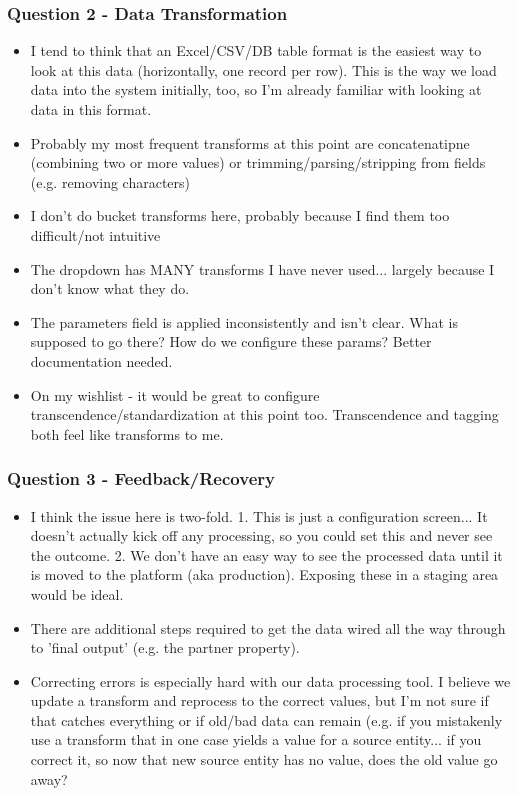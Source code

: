\documentclass[12pt,letterpaper]{article}
\begin{document}
\subsubsection*{Question 2 - Data Transformation}
\begin{itemize}
    \item I tend to think that an Excel/CSV/DB table format is the easiest way to look at this data (horizontally, one record per row). This is the way we load data into the system initially, too, so I'm already familiar with looking at data in this format. 
    \item Probably my most frequent transforms at this point are concatenatipne (combining two or more values) or trimming/parsing/stripping from fields (e.g. removing characters)
    \item I don't do bucket transforms here, probably because I find them too difficult/not intuitive
    \item The dropdown has MANY transforms I have never used... largely because I don't know what they do. 
    \item The parameters field is applied inconsistently and isn't clear. What is supposed to go there? How do we configure these params? Better documentation needed.
    \item On my wishlist - it would be great to configure transcendence/standardization at this point too. Transcendence and tagging both feel like transforms to me.
\end{itemize}

\subsubsection*{Question 3 - Feedback/Recovery}
\begin{itemize}
    \item I think the issue here is two-fold. 1. This is just a configuration screen... It doesn't actually kick off any processing, so you could set this and never see the outcome. 2. We don't have an easy way to see the processed data until it is moved to the platform (aka production). Exposing these in a staging area would be ideal.
    \item There are additional steps required to get the data wired all the way through to 'final output' (e.g. the partner property). 
    \item Correcting errors is especially hard with our data processing tool. I believe we update a transform and reprocess to the correct values, but I'm not sure if that catches everything or if old/bad data can remain (e.g. if you mistakenly use a transform that in one case yields a value for a source entity... if you correct it, so now that new source entity has no value, does the old value go away?
\end{itemize}
\end{document}

